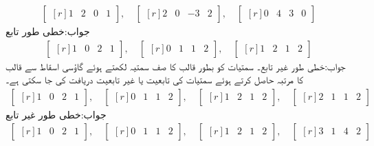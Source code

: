 \begin{align*}
\begin{bmatrix*}[r] 
1&2&0&1
\end{bmatrix*},\quad \begin{bmatrix*}[r] 
2&0&-3&2
\end{bmatrix*},\quad \begin{bmatrix*}[r] 
0&4&3&0
\end{bmatrix*}
\end{align*}
جواب:خطی طور تابع
\begin{align*}
\begin{bmatrix*}[r] 
1&0&2&1
\end{bmatrix*},\quad \begin{bmatrix*}[r] 
0&1&1&2
\end{bmatrix*},\quad \begin{bmatrix*}[r] 
1&2&1&2
\end{bmatrix*}
\end{align*}
جواب:خطی طور غیر تابع۔ سمتیات کو بطور قالب کا   صف سمتیہ لکھتے ہوئے گاؤسی اسقاط سے قالب کا مرتبہ حاصل کرتے ہوئے سمتیات کی تابعیت یا غیر تابعیت دریافت کی جا سکتی ہے۔
\begin{align*}
\begin{bmatrix*}[r] 
1&0&2&1
\end{bmatrix*},\quad\begin{bmatrix*}[r] 
0&1&1&2
\end{bmatrix*},\quad\begin{bmatrix*}[r] 
1&2&1&2
\end{bmatrix*},\quad\begin{bmatrix*}[r] 
2&1&1&2
\end{bmatrix*}
\end{align*}
جواب:خطی طور غیر تابع
\begin{align*}
\begin{bmatrix*}[r] 
1&0&2&1
\end{bmatrix*},\quad \begin{bmatrix*}[r] 
0&1&1&2
\end{bmatrix*},\quad \begin{bmatrix*}[r] 
1&2&1&2
\end{bmatrix*},\quad \begin{bmatrix*}[r] 
3&1&4&2
\end{bmatrix*}
\end{align*}
